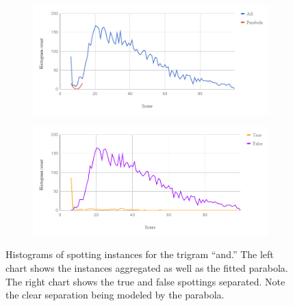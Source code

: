 \documentclass[ms,electronic,twosidetoc,letterpaper,chaptercenter,parttop,lof,lot]{byumsphd}
\begin{document}


\begin{figure}
\centering
    \begin{subfigure}{.89\textwidth}
  		\centering
  		\includegraphics[width=.99\linewidth]{two_dist_ex_All}
	\end{subfigure}
	\begin{subfigure}{.89\textwidth}
  		\centering
  		\includegraphics[width=.99\linewidth]{two_dist_ex_TF}
	\end{subfigure}
    \caption{Histograms of spotting instances for the trigram ``and.'' The left chart shows the instances aggregated as well as the fitted parabola. The right chart shows the true and false spottings separated. Note the clear separation being modeled by the parabola.
    }
    \label{fig:two_dist_ex}
\end{figure}
\end{document}
